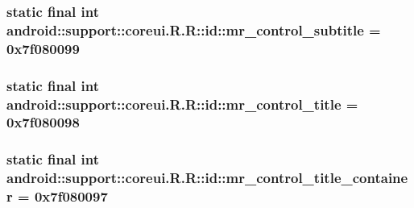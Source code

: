 \hypertarget{classandroid_1_1support_1_1coreui_1_1_r_1_1id_21a8da447087c2afd2c98380e59196d8}{
\subsubsection[{mr\_\-control\_\-subtitle}]{\setlength{\rightskip}{0pt plus 5cm}static final int android::support::coreui.R.R::id::mr\_\-control\_\-subtitle = 0x7f080099}}
\label{classandroid_1_1support_1_1coreui_1_1_r_1_1id_21a8da447087c2afd2c98380e59196d8}


\hypertarget{classandroid_1_1support_1_1coreui_1_1_r_1_1id_d93239b3c9ebfedb486962425a72ce7c}{
\subsubsection[{mr\_\-control\_\-title}]{\setlength{\rightskip}{0pt plus 5cm}static final int android::support::coreui.R.R::id::mr\_\-control\_\-title = 0x7f080098}}
\label{classandroid_1_1support_1_1coreui_1_1_r_1_1id_d93239b3c9ebfedb486962425a72ce7c}


\hypertarget{classandroid_1_1support_1_1coreui_1_1_r_1_1id_11da99146ac96ec22201afb175468354}{
\subsubsection[{mr\_\-control\_\-title\_\-container}]{\setlength{\rightskip}{0pt plus 5cm}static final int android::support::coreui.R.R::id::mr\_\-control\_\-title\_\-container = 0x7f080097}}
\label{classandroid_1_1support_1_1coreui_1_1_r_1_1id_11da99146ac96ec22201afb175468354}


